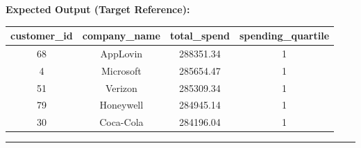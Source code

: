 \documentclass[11pt,a4paper]{article}
\begin{document}
\vspace{0.3cm}
\noindent\textbf{Expected Output (Target Reference):}
\begin{center}
\small
\begin{tabular}{cccc}
\toprule
\textbf{customer\_id} & \textbf{company\_name} & \textbf{total\_spend} & \textbf{spending\_quartile} \\
\midrule
68 & AppLovin & 288351.34 & 1 \\
4 & Microsoft & 285654.47 & 1 \\
51 & Verizon & 285309.34 & 1 \\
79 & Honeywell & 284945.14 & 1 \\
30 & Coca-Cola & 284196.04 & 1 \\
\bottomrule
\end{tabular}
\end{center}

\vspace{0.4cm}
\noindent\rule{\textwidth}{0.4pt}
\vspace{0.4cm}
\end{document}
